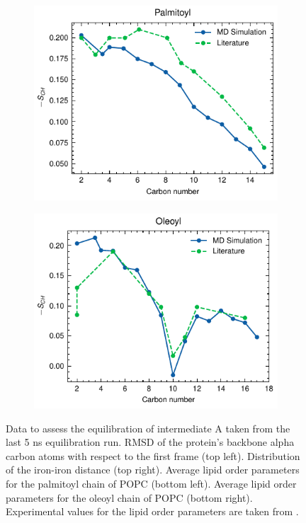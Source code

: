 \begin{figure}[htbp]
\begin{subfigure}{.49\textwidth}
        \includegraphics[width=\textwidth]{Figures/A_palmitoyl.pdf}
    \end{subfigure}
    \begin{subfigure}{.49\textwidth}
        \centering
        \includegraphics[width=\textwidth]{Figures/A_oleoyl.pdf}
    \end{subfigure}
    \caption{Data to assess the equilibration of intermediate A taken from the last 5 ns equilibration run. RMSD of the protein's backbone alpha carbon atoms with respect to the first frame (top left). Distribution of the iron-iron distance (top right). Average lipid order parameters for the palmitoyl chain of POPC (bottom left). Average lipid order parameters for the oleoyl chain of POPC (bottom right). Experimental values for the lipid order parameters are taken from \cite{Seelig1978,Perly1985}.}
    \label{fig:A_equilibration}
\end{figure}

